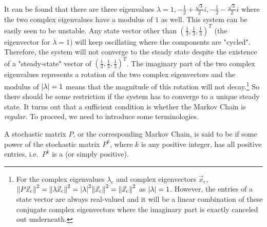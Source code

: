 It can be found that there are three eigenvalues $\lambda = 1, -\frac{1}{2} + \frac{\sqrt{3}}{2}i, -\frac{1}{2} - \frac{\sqrt{3}}{2}i$ where the two complex eigenvalues have a modulus of $1$ as well. This system can be easily seen to be unstable. Any state vector other than $(\frac{1}{3}, \frac{1}{3}, \frac{1}{3})^T$ (the eigenvector for $\lambda = 1$) will keep oscillating where the components are "cycled". Therefore, the system will not converge to the steady state despite the existence of a "steady-state" vector of $(\frac{1}{3}, \frac{1}{3}, \frac{1}{3})^T$. The imaginary part of the two complex eigenvalues represents a rotation of the two complex eigenvectors and the modulus of $\abs{\lambda} = 1$ means that the magnitude of this rotation will not decay.\footnote{For the complex eigenvalues $\lambda_{\text{c}}$ and complex eigenvectors $\vec{x}_{\text{c}}$, $\norm{P\vec{x}_{\text{c}}}^2 = \norm{\lambda\vec{x}_{\text{c}}}^2 = \abs{\lambda}^2 \norm{\vec{x}_{\text{c}}}^2 = \norm{\vec{x}_{\text{c}}}^2$ as $\abs{\lambda} = 1$. However, the entries of a state vector are always real-valued and it will be a linear combination of these conjugate complex eigenvectors where the imaginary part is exactly canceled out underneath.} So there should be some restriction if the system has to converge to a unique steady state. It turns out that a sufficient condition is whether the Markov Chain is \textit{regular}. To proceed, we need to introduce some terminologies.

\begin{defn}
\label{defn:regularstoc}
A stochastic matrix $P$, or the corresponding Markov Chain, is said to be  if some power of the stochastic matrix $P^k$, where $k$ is any positive integer, has all positive entries, i.e.\ $P^k$ is a  (or simply positive).
\end{defn}

